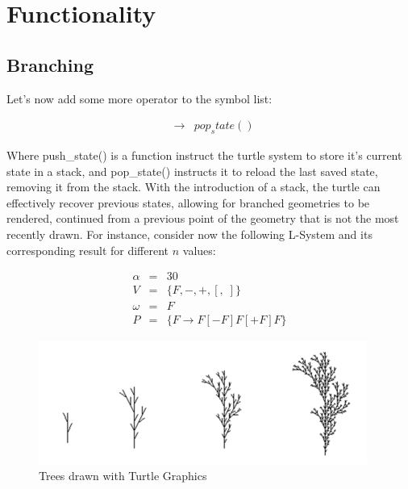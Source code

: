 \documentclass{acmtog}
\begin{document}
\section{Functionality}
\label{sec:functionality}

\subsection{Branching}
\label{subsec:branching}

Let's now add some more operator to the symbol list:

\begin{eqnarray}
    [ & \rightarrow &  push_state()  \nonumber \\
    ] & \rightarrow &  pop_state()   \nonumber
\end{eqnarray}

Where push\_state() is a function instruct the turtle system to store it's current state in a stack, and pop\_state() instructs it to reload the last saved state, removing it from the stack. With the introduction of a stack, the turtle can effectively recover previous states, allowing for branched geometries to be rendered, continued from a previous point of the geometry that is not the most recently drawn. For instance, consider now the following L-System and its corresponding result for different $n$ values:

\begin{eqnarray}
  \alpha  &=& 30                        \nonumber \\
  V       &=& \{F, -, +, [,\; ]\}       \nonumber \\
  \omega  &=& F                          \nonumber \\
  P       &=& \{F \rightarrow F[-F]F[+F]F\} \nonumber
\end{eqnarray}

\begin{figure}[!htp]
  \begin{center}
    \includegraphics[width=\columnwidth]{images/3_tree}
    \caption{Trees drawn with Turtle Graphics \label{fig:tree}}
    \end{center}
\end{figure}
\end{document}

